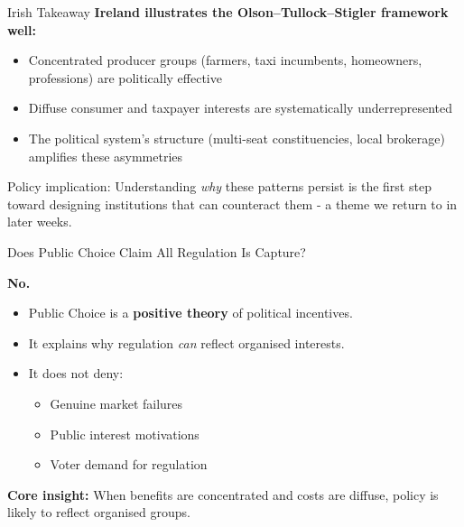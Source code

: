 \documentclass[10pt]{beamer}
\begin{document}
\begin{frame}{Irish Takeaway}
\textbf{Ireland illustrates the Olson--Tullock--Stigler framework well:}

\vspace{0.1cm}
\begin{itemize}
\item Concentrated producer groups (farmers, taxi incumbents, homeowners, professions) are politically effective
\item Diffuse consumer and taxpayer interests are systematically underrepresented
\item The political system's structure (multi-seat constituencies, local brokerage) \alert{amplifies} these asymmetries
\end{itemize}

\vspace{0.2cm}
\alert{Policy implication:}
Understanding \emph{why} these patterns persist is the first step toward designing institutions that can counteract them - a theme we return to in later weeks.
\end{frame}
\begin{frame}{Does Public Choice Claim All Regulation Is Capture?}
\small

\textbf{No.}

\begin{itemize}
\item Public Choice is a \textbf{positive theory} of political incentives.
\item It explains why regulation \emph{can} reflect organised interests.
\item It does not deny:
\begin{itemize}
\item Genuine market failures
\item Public interest motivations
\item Voter demand for regulation
\end{itemize}
\end{itemize}

\vspace{0.3cm}

\textbf{Core insight:}
When benefits are concentrated and costs are diffuse, policy is likely to reflect organised groups.

\end{frame}
\end{document}
